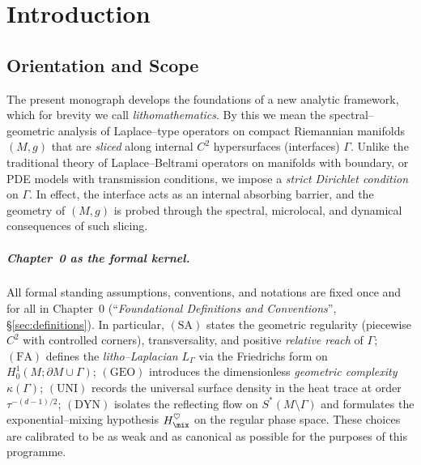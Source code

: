 \chapter{Introduction}

\section*{Orientation and Scope}

The present monograph develops the foundations of a new analytic framework,
which for brevity we call \emph{lithomathematics}.
By this we mean the spectral–geometric analysis of Laplace–type operators
on compact Riemannian manifolds $(M,g)$ that are \emph{sliced} along internal
$C^2$ hypersurfaces (interfaces) $\Gamma$.
Unlike the traditional theory of Laplace–Beltrami operators on manifolds with
boundary, or PDE models with transmission conditions, we impose a \emph{strict
Dirichlet condition} on $\Gamma$. In effect, the interface acts as an internal
absorbing barrier, and the geometry of $(M,g)$ is probed through the spectral,
microlocal, and dynamical consequences of such slicing.

\paragraph{Chapter~0 as the formal kernel.}
All formal standing assumptions, conventions, and notations are fixed once and for all in
Chapter~0 (“\emph{Foundational Definitions and Conventions}”, \S\ref{sec:definitions}).
In particular, $(\mathrm{SA})$ states the geometric regularity (piecewise $C^2$ with controlled corners), transversality, and positive \emph{relative reach} of $\Gamma$;
$(\mathrm{FA})$ defines the \emph{litho–Laplacian} $L_\Gamma$ via the Friedrichs form on $H^1_0(M;\partial M\cup\Gamma)$;
$(\mathrm{GEO})$ introduces the dimensionless \emph{geometric complexity} $\kappa(\Gamma)$;
$(\mathrm{UNI})$ records the universal surface density in the heat trace at order $\tau^{-(d-1)/2}$;
$(\mathrm{DYN})$ isolates the reflecting flow on $S^*(M\setminus\Gamma)$ and formulates the exponential–mixing hypothesis $H_{\mix}^\heartsuit$ on the regular phase space.
These choices are calibrated to be as weak and as canonical as possible for the purposes of this programme.

